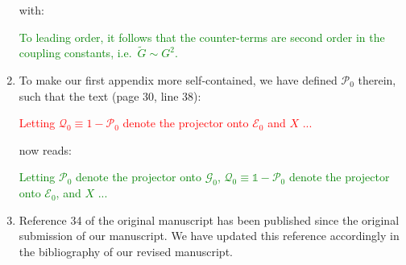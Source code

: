 \documentclass[preprint]{revtex4-1}
\newcommand{\E}{\mathcal{E}}
\newcommand{\G}{\mathcal{G}}
\renewcommand{\P}{\mathcal{P}}
\newcommand{\Q}{\mathcal{Q}}
\newcommand{\1}{\mathds{1}}
\newcommand{\red}[1]{\textcolor{red}{#1}}
\newcommand{\green}[1]{\textcolor{green}{#1}}
\begin{document}
\begin{enumerate}[label=(R3.\arabic*)]
  with:

  \green{To leading order, it follows that the counter-terms are
    second order in the coupling constants, i.e.~$\tilde G\sim G^2$.}


\item To make our first appendix more self-contained, we have defined
  $\P_0$ therein, such that the text (page 30, line 38):

  \red{Letting $\Q_0\equiv1-\P_0$ denote the projector onto $\E_0$ and
    $X$ ...}

  now reads:

  \green{Letting $\P_0$ denote the projector onto $\G_0$,
    $\Q_0\equiv\1-\P_0$ denote the projector onto $\E_0$, and $X$ ...}


\item Reference 34 of the original manuscript has been published since
  the original submission of our manuscript.  We have updated this
  reference accordingly in the bibliography of our revised manuscript.

\end{enumerate}
\end{document}
